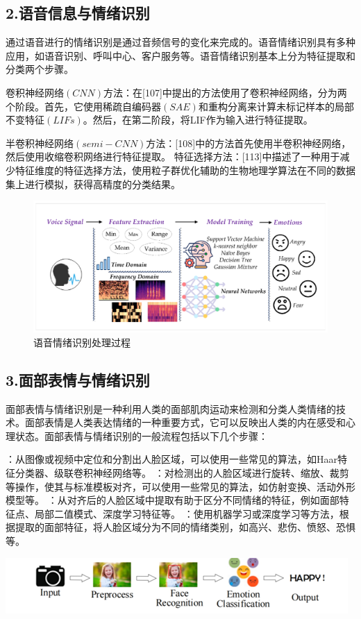 \documentclass[conference]{IEEEtran}
\begin{document}
\subsection*{2.语音信息与情绪识别}
通过语音进行的情绪识别是通过音频信号的变化来完成的。语音情绪识别具有多种应用，如语音识别、呼叫中心、客户服务等。语音情绪识别基本上分为特征提取和分类两个步骤。

卷积神经网络$(CNN)$方法：在[107]中提出的方法使用了卷积神经网络，分为两个阶段。首先，它使用稀疏自编码器$(SAE)$和重构分离来计算未标记样本的局部不变特征$(LIFs)$。然后，在第二阶段，将LIF作为输入进行特征提取。

半卷积神经网络$(semi-CNN)$方法：[108]中的方法首先使用半卷积神经网络，然后使用收缩卷积网络进行特征提取。
特征选择方法：[113]中描述了一种用于减少特征维度的特征选择方法，使用粒子群优化辅助的生物地理学算法在不同的数据集上进行模拟，获得高精度的分类结果。
\begin{figure}
    \centering
    \includegraphics*[scale=0.64]{images/speechrecogniton.png}
\caption[short]{语音情绪识别处理过程}
\end{figure}
\subsection*{3.面部表情与情绪识别}
面部表情与情绪识别是一种利用人类的面部肌肉运动来检测和分类人类情绪的技术。面部表情是人类表达情绪的一种重要方式，它可以反映出人类的内在感受和心理状态。面部表情与情绪识别的一般流程包括以下几个步骤：

\begin{enumerate}
    ：从图像或视频中定位和分割出人脸区域，可以使用一些常见的算法，如Haar特征分类器、级联卷积神经网络等。
    ：对检测出的人脸区域进行旋转、缩放、裁剪等操作，使其与标准模板对齐，可以使用一些常见的算法，如仿射变换、活动外形模型等。
    ：从对齐后的人脸区域中提取有助于区分不同情绪的特征，例如面部特征点、局部二值模式、深度学习特征等。
    ：使用机器学习或深度学习等方法，根据提取的面部特征，将人脸区域分为不同的情绪类别，如高兴、悲伤、愤怒、恐惧等。
    
\end{enumerate}
\includegraphics*[scale=0.6]{images/facialemotion.png}
\end{document}

